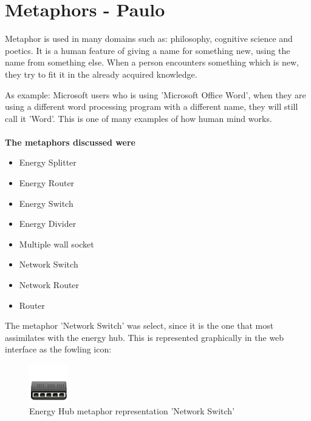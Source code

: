 \section{Metaphors - Paulo}

Metaphor is used in many domains such as: philosophy, cognitive science and poetics. It is a human feature of giving a name for something new, using the name from something else. When a person encounters something which is new, they try to fit it in the already acquired knowledge.

As example: Microsoft users who is using 'Microsoft Office Word', when they are using a different word processing program with a different name, they will still call it 'Word'. This is one of many examples of how human mind works.\\\\
\textbf{The metaphors discussed were}
\begin{itemize}
	\item Energy Splitter
	\item Energy Router
	\item Energy Switch
	\item Energy Divider
	\item Multiple wall socket
	\item Network Switch
	\item Network Router
	\item Router
\end{itemize}

The metaphor 'Network Switch' was select, since it is the one that most assimilates with the energy hub. This is represented graphically in the web interface as the fowling icon:

\begin{figure}[H]
	\center
	\includegraphics[width=0.15\textwidth]{images/dock_hub.png}
   	\caption{Energy Hub metaphor representation 'Network Switch'}
\end{figure}







